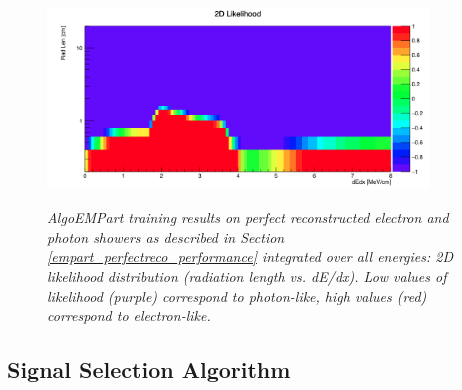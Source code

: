 \begin{figure}[ht!]
\centering
\includegraphics[width=0.9\textwidth]{Figures/EMPartTraining/mc_trained/2DRatio.png}\\
\caption{\textit{AlgoEMPart training results on perfect reconstructed electron and photon showers as described in Section \ref{empart_perfectreco_performance} integrated over all energies: 2D likelihood distribution (radiation length vs. dE/dx). Low values of likelihood (purple) correspond to photon-like, high values (red) correspond to electron-like.}}
\label{empart_perfectreco_performance_fig1}
\end{figure}























































\subsection{Signal Selection Algorithm}

